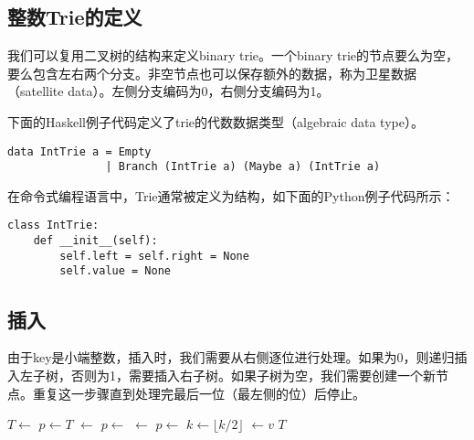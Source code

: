 \documentclass[UTF8]{article}
\begin{document}
\subsection{整数Trie的定义}
我们可以复用二叉树的结构来定义binary trie。一个binary trie的节点要么为空，要么包含左右两个分支。非空节点也可以保存额外的数据，称为卫星数据（satellite data）。左侧分支编码为0，右侧分支编码为1。

下面的Haskell例子代码定义了trie的代数数据类型（algebraic data type）。

\lstset{language=Haskell}
\begin{lstlisting}
data IntTrie a = Empty
               | Branch (IntTrie a) (Maybe a) (IntTrie a)
\end{lstlisting}

在命令式编程语言中，Trie通常被定义为结构，如下面的Python例子代码所示：

\lstset{language=Python}
\begin{lstlisting}
class IntTrie:
    def __init__(self):
        self.left = self.right = None
        self.value = None
\end{lstlisting}


\subsection{插入}

由于key是小端整数，插入时，我们需要从右侧逐位进行处理。如果为0，则递归插入左子树，否则为1，需要插入右子树。如果子树为空，我们需要创建一个新节点。重复这一步骤直到处理完最后一位（最左侧的位）后停止。

\begin{algorithmic}[1]
    \State $T \gets$ 
  \EndIf
  \State $p \gets T$
        \State {} $\gets$ 
      \EndIf
      \State $p \gets$ 
    \Else
        \State {} $\gets$ 
      \EndIf
      \State $p \gets$ 
    \EndIf
    \State $k \gets \lfloor k/2 \rfloor$
  \EndWhile
  \State {} $\gets v$
  \State \Return $T$
\EndFunction
\end{algorithmic}
\end{document}
